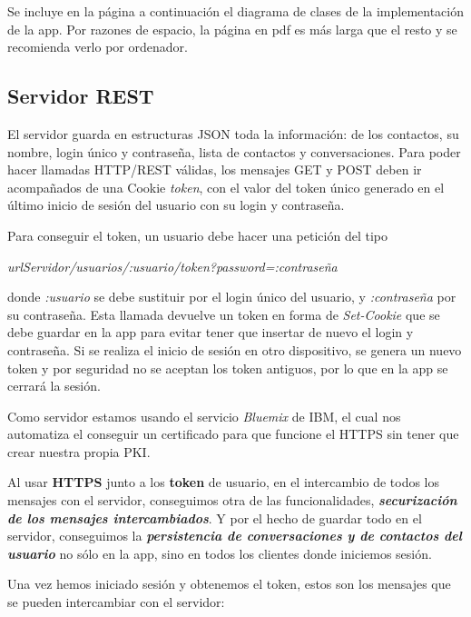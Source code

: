\documentclass[]{article}
\begin{document}
Se incluye en la página a continuación el diagrama de clases de la implementación de la app. Por razones de espacio, la página en pdf es más larga que el resto y se recomienda verlo por ordenador.



\subsection{Servidor REST}

El servidor guarda en estructuras JSON toda la información: de los contactos, su nombre, login único y contraseña, lista de contactos y conversaciones. Para poder hacer llamadas HTTP/REST válidas, los mensajes GET y POST deben ir acompañados de una Cookie \textit{token}, con el valor del token único generado en el último inicio de sesión del usuario con su login y contraseña.

Para conseguir el token, un usuario debe hacer una petición del tipo

 \textit{urlServidor/usuarios/:usuario/token?password=:contraseña}
 
  donde \textit{:usuario} se debe sustituir por el login único del usuario, y \textit{:contraseña} por su contraseña. Esta llamada devuelve un token en forma de \textit{Set-Cookie} que se debe guardar en la app para evitar tener que insertar de nuevo el login y contraseña. Si se realiza el inicio de sesión en otro dispositivo, se genera un nuevo token y por seguridad no se aceptan los token antiguos, por lo que en la app se cerrará la sesión.

\hfill

Como servidor estamos usando el servicio \textit{Bluemix} de IBM, el cual nos automatiza el conseguir un certificado para que funcione el HTTPS sin tener que crear nuestra propia PKI.

\hfill

Al usar \textbf{HTTPS} junto a los \textbf{token} de usuario, en el intercambio de todos los mensajes con el servidor, conseguimos otra de las funcionalidades, \textbf{\textit{securización de los mensajes intercambiados}}. Y por el hecho de guardar todo en el servidor, conseguimos la \textbf{\textit{persistencia de conversaciones y de contactos del usuario}} no sólo en la app, sino en todos los clientes donde iniciemos sesión.

\hfill

Una vez hemos iniciado sesión y obtenemos el token, estos son los mensajes que se pueden intercambiar con el servidor:
\end{document}
